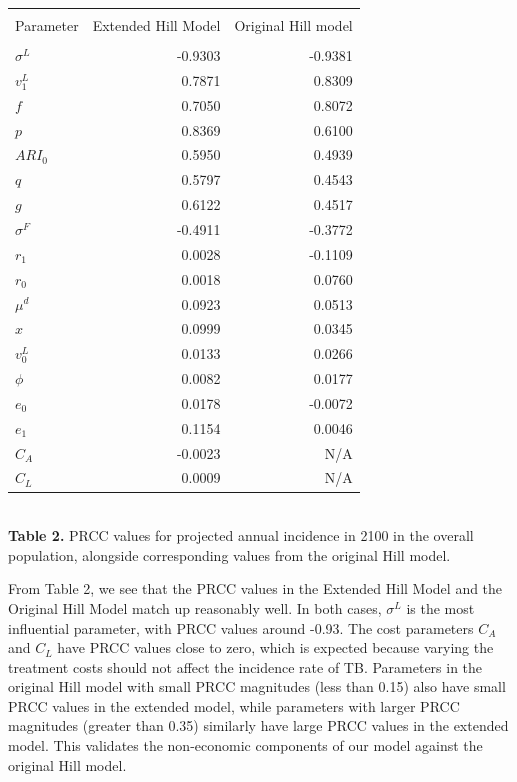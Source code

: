 \documentclass{amsart}
\begin{document}
\begin{table}[h]
\centering
\begin{tabular}{l r r}
\hline\hline\\
Parameter & Extended Hill Model & Original Hill model \\ [0.5ex]
\hline\\
$\sigma^{L}$  & -0.9303 & -0.9381 \\
$v^{L}_{1}$   & 0.7871  & 0.8309 \\
$f$                 & 0.7050  & 0.8072 \\
$p$                & 0.8369  & 0.6100 \\
$ARI_{0}$      & 0.5950  & 0.4939 \\
$q$                & 0.5797  & 0.4543 \\
$g$                & 0.6122  & 0.4517 \\
$\sigma^{F}$ & -0.4911 & -0.3772 \\
$r_{1}$          & 0.0028  & -0.1109 \\
$r_{0}$          & 0.0018  & 0.0760 \\
$\mu^{d}$      & 0.0923 & 0.0513 \\
$x$                 & 0.0999 & 0.0345 \\
$v^{L}_{0}$    & 0.0133 & 0.0266 \\
$\phi$             & 0.0082 & 0.0177 \\
$e_{0}$          & 0.0178 & -0.0072 \\
$e_{1}$          & 0.1154 & 0.0046 \\
$C_{A}$          & -0.0023 & N/A \\
$C_{L}$           & 0.0009 & N/A \\ [1ex]
\hline
\end{tabular}\\[1ex]

{\bf Table 2.} PRCC values for projected annual incidence in 2100
 in the overall population, alongside corresponding values from the
original Hill model.
\end{table}

From Table 2, we see that the PRCC values in the Extended Hill Model and the Original Hill Model match up reasonably well.  In both cases, $\sigma^{L}$ is the most influential parameter, with PRCC values around -0.93.  The cost parameters $C_{A}$ and $C_{L}$ have PRCC values close to zero, which is expected because varying the treatment costs should not affect the incidence rate of TB.  Parameters in the original Hill model with small PRCC magnitudes (less than 0.15) also have small PRCC values in the extended model, while parameters with larger PRCC magnitudes (greater than 0.35) similarly have large PRCC values in the extended model.  This validates the non-economic components of our model against the original Hill model.   \\
\end{document}
